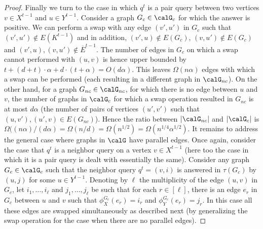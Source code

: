 \begin{proof}
 Finally we turn to the case in which $q^t$ is a pair query between two vertices $v\in X^{t-1}$ and $u\in Y^{t-1}$. Consider a graph $G_c \in \calG_c$ for which the answer is positive.
 We can perform a swap with any edge $(v',u')$ in $G_c$ such that
 $(v',u')\notin E(K^{t-1})$ and  in addition, $(v',u)\notin E(G_c)$, $(v,u')\notin E(G_c)$ and $(v',u), (v,u')\notin \overline{E}^{t-1}$. The number of edges in $G_c$ on which a swap cannot performed with $(u,v)$ is hence upper bounded by $t+ (d+t)\cdot \alpha + d\cdot (t+\alpha) = O(d\alpha)$. This leaves $\Omega(n\alpha)$ edges with which a swap can be performed (each resulting in a different graph in $\calG_{nc}$). On the other hand, for a graph $G_{nc}\in \calG_{nc}$, for which there is no edge between $u$ and $v$, the number of graphs in $\calG_c$ for which a swap operation resulted in $G_{nc}$ is at most $d\alpha$ (the number of pairs of vertices $(u',v')$ such that $(u,v'),(u',v)\in E(G_{nc})$). Hence the ratio between $|\calG_{nc}|$ and $|\calG_c|$ is $\Omega((n\alpha)/(d\alpha) = \Omega(n/d) = \Omega(n^{1/2})= \Omega(n^{1/4}\alpha^{1/2})$.
\iffalse
It remains to address the general  case where graphs in $\calG$ have parallel edges. Once again, consider the case that $q^t$ is a neighbor query on a vertex $v\in X^{t-1}$ (here too the case in which it is a pair query is dealt with essentially the same). Consider any graph $G_c \in \calG_c$ such that  the neighbor query $q^t = (v,i)$  is answered in $\tau(G_c)$ by $(u,j)$ for some $u \in Y^{t-1}$. Denoting by $\ell$ the multiplicity of the edge $(u,v)$ in $G_c$, let $i_1,\dots,i_\ell$ and $j_1,\dots,j_\ell$ be such that for each $r \in [\ell]$, there is an edge $e_r$ in $G_c$ between $u$ and $v$ such that $\phi^{G_c}_X(e_r)=i_r$ and $\phi^{G_c}_Y(e_r)=j_r$.
      In this case all these edges are swapped simultaneously as described next (by generalizing the swap operation for the case when there are no parallel edges).


\end{proof}
